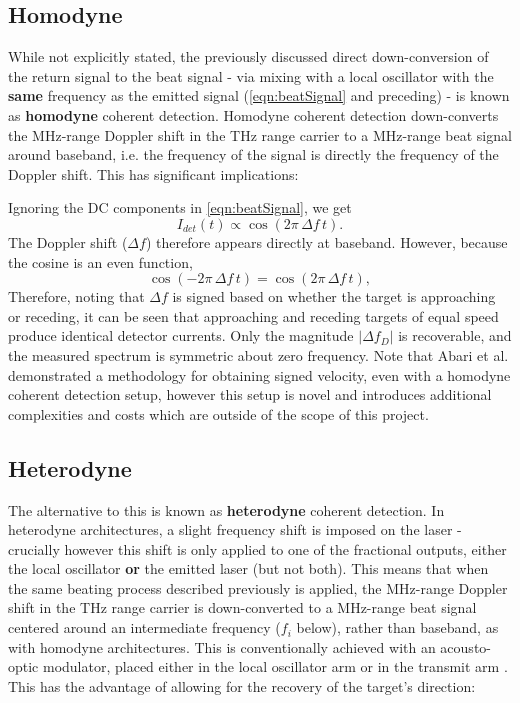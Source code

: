    \subsection{Homodyne}
    While not explicitly stated, the previously discussed direct down-conversion of the return signal to the beat signal - via mixing with a local oscillator with the \textbf{same} frequency as the emitted signal (\autoref{eqn:beatSignal} and preceding) - is known as \textbf{homodyne} coherent detection. Homodyne coherent detection down-converts the MHz-range Doppler shift in the THz range carrier to a MHz-range beat signal around baseband, i.e. the frequency of the signal is directly the frequency of the Doppler shift. This has significant implications:

    Ignoring the DC components in \autoref{eqn:beatSignal}, we get
    \begin{equation}
        I_{det}(t) \propto \cos\!\left( 2\pi \, \Delta f \, t \right).
        \label{eq:homodyne_beat}
    \end{equation}
    The Doppler shift ($\Delta f$) therefore appears directly at baseband. However, because the
    cosine is an even function,
    \begin{equation}
        \cos\!\left( -2\pi \, \Delta f \, t \right)
        = \cos\!\left( 2\pi \, \Delta f \, t \right),
        \label{eq:sign_ambiguity}
    \end{equation}
    Therefore, noting that $\Delta f$ is signed based on whether the target is approaching or receding, it can be seen that approaching and receding targets of equal speed produce identical detector
    currents. Only the magnitude $\lvert \Delta f_D \rvert$ is recoverable, and the
    measured spectrum is symmetric about zero frequency. Note that Abari et al. \cite{abari_all-fiber_2014} demonstrated a methodology for obtaining signed velocity, even with a homodyne coherent detection setup, however this setup is novel and introduces additional complexities and costs which are outside of the scope of this project. 

    \subsection{Heterodyne}
    The alternative to this is known as \textbf{heterodyne} coherent detection. In heterodyne architectures, a slight frequency shift is imposed on the laser - crucially however this shift is only applied to one of the fractional outputs, either the local oscillator \textbf{or} the emitted laser (but not both). This means that when the same beating process described previously is applied, the MHz-range Doppler shift in the THz range carrier is down-converted to a MHz-range beat signal centered around an intermediate frequency ($f_i$ below), rather than baseband, as with homodyne architectures. This is conventionally achieved with an
    acousto-optic modulator, placed either in the local oscillator arm \cite{harris_role_1998} or in the transmit arm \cite{abdelazim_development_2015}. This has the advantage of allowing for the recovery of the target's direction:
    
